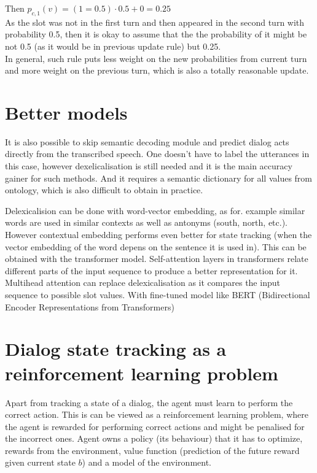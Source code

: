 \documentclass[12pt,titlepage,a4paper]{article}
\begin{document}
\noindent Then $p_{c,1}(v) = (1 = 0.5) \cdot 0.5 + 0 = 0.25$ \\

\noindent As the slot was not in the first turn and then appeared in the second turn with probability 0.5, then it is okay to assume that the the probability of it might be not 0.5 (as it would be in previous update rule) but 0.25. \\

\noindent In general, such rule puts less weight on the new probabilities from current turn and more weight on the previous turn, which is also a totally reasonable update. 

\section{Better models}
It is also possible to skip semantic decoding module and predict dialog acts directly from the transcribed speech. One doesn't have to label the utterances in this case, however dexelicalisation is still needed and it is the main accuracy gainer for such methods. And it requires a semantic dictionary for all values from ontology, which is also difficult to obtain in practice.

Delexicalision can be done with word-vector embedding, as for. example similar words are used in similar contexts as well as antonyms (south, north, etc.). However contextual embedding performs even better for state tracking (when the vector embedding of the word depens on the sentence it is used in). This can be obtained with the transformer model. Self-attention layers in transformers relate different parts of the input sequence to produce a better representation for it. Multihead attention can replace delexicalisation as it compares the input sequence to possible slot values. With fine-tuned model like BERT (Bidirectional Encoder Representations from Transformers) 

\section{Dialog state tracking as a reinforcement learning problem}
Apart from tracking a state of a dialog, the agent must learn to perform the correct action. This is can be viewed as a reinforcement learning problem, where the agent is rewarded for performing correct actions and might be penalised for the incorrect ones. Agent owns a policy (its behaviour) that it has to optimize, rewards from the environment, value function (prediction of the future reward given current state $b$) and a model of the environment.
\end{document}
